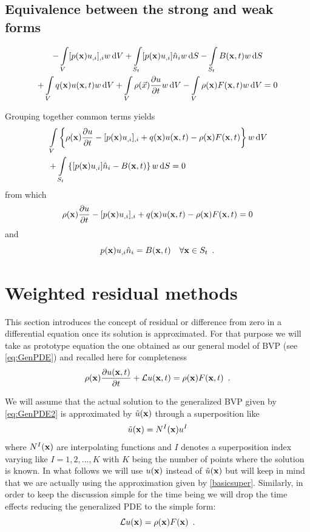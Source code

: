 \subsection{Equivalence between the strong and weak forms}
\begin{multline}
    -\int\limits_V [p(\vb x)u_{,i}]_{,i}w \dd{V} + \int\limits_{S_t} [p(\vb x)u_{,i}] \hat n_i w\dd{S} - \int\limits_{S_t} B(\vb x, t)w\dd{S}\\
    + \int\limits_V q(\vb x)u(\vb x, t)w \dd{V}  + \int\limits_V \rho(\vec x)\pdv{u}{t}w\dd{V} - \int\limits_V \rho(\vb x)F(\vb x, t)w\dd{V} = 0 
\end{multline}

Grouping together common terms yields
\begin{align*}
&\int\limits_V \left\{\rho(\vb x)\pdv{u}{t} - [p(\vb x)u_{,i}]_{,i} + q(\vb x)u(\vb x, t) - \rho(\vb x)F(\vb x, t)\right\} w\dd{V}\\
&+ \int \limits_{S_t} \left\{[p(\vb x)u_{,i}]\hat n_i - B(\vb x, t) \right\} w\dd{S} = 0
\end{align*}
from which
\[\rho(\vb x)\pdv{u}{t} - [p(\vb x)u_{,i}]_{,i} + q(\vb x)u(\vb x, t) - \rho(\vb x)F(\vb x, t) = 0\]
and
\[p(\vb x)u_{,i}\hat n_i = B(\vb x, t)  \quad\forall \vb x \in S_t \enspace .\]

\section{Weighted residual methods}
This section introduces the concept of residual or difference from zero in a differential equation once its solution is approximated. For that purpose we will take as prototype equation the one obtained as our general model of BVP (see \cref{eq:GenPDE}) and recalled here for completeness
\begin{equation}
\rho(\vb x) \pdv{u(\vb x, t)}{t} + \mathcal{L}u(\vb x, t) = \rho (\vb x)F(\vb x, t) \enspace .
\label{eq:GenPDE2}
\end{equation}

We will assume that the actual solution to the generalized BVP given by \cref{eq:GenPDE2} is approximated by $\tilde u(\vb{x})$ through a superposition like
\begin{equation}
\tilde u (\vb{x}) = {N^I}(\vb{x}){u^I}
\label{basicsuper}
\end{equation}
where ${N^I}(\vb{x})$ are interpolating functions and $I$ denotes a superposition index  varying like $I=1,2,...,K$ with $K$ being the number of points where the solution is known. In what follows we will use $u(\vb{x})$ instead of $\tilde u (\vb{x})$ but will keep in mind that we are actually using the approximation given by \cref{basicsuper}. Similarly, in order to keep the discussion simple for the time being we will drop the time effects reducing the generalized PDE to the simple form:
\begin{equation}
\mathcal{L}u(\vb x) = \rho (\vb x)F(\vb x) \enspace .
\label{eq:GenPDE3}
\end{equation}

